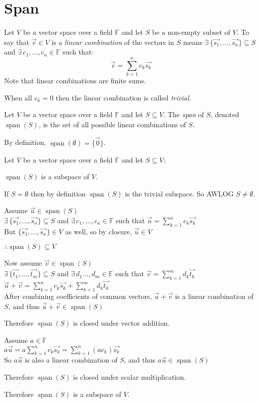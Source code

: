 \documentclass[letterpaper,12pt,fleqn]{article}
\newcommand{\F}{\mathbb{F}}
\newcommand{\vu}{\vec{u}}
\newcommand{\vv}{\vec{v}}
\newcommand{\vz}{\vec{0}}
\DeclareMathOperator{\spn}{span}
\begin{document}
\section*{Span}

\begin{definition}
  Let $V$ be a vector space over a field $\F$ and let $S$ be a non-empty subset
  of $V$. To say that $\vv\in V$ is a \emph{linear combination} of the
  vectors in $S$ means $\exists\,\{\vec{s_1},\ldots,\vec{s_n}\}\subseteq S$ and
  $\exists\,c_1,\ldots,c_n\in\F$ such that:
  \[\vv=\sum_{k=1}^nc_k\vec{s_k}\]
  Note that linear combinations are finite sums.

  When all $c_k=0$ then the linear combination is called \emph{trivial}.
\end{definition}

\begin{definition}[Span]
  Let $V$ be a vector space over a field $\F$ and let $S\subseteq V$. The
  \emph{span} of $S$, denoted $\spn(S)$, is the set of all possible linear
  combinations of $S$.

  By definition, $\spn(\emptyset)=\{\vz\}$.
\end{definition}

\begin{theorem}
  Let $V$ be a vector space over a field $\F$ and let $S\subseteq V$:

  $\spn(S)$ is a subspace of $V$.
\end{theorem}

\begin{theproof}
  If $S=\emptyset$ then by definition $\spn(S)$ is the trivial subspace. So
  AWLOG $S\ne\emptyset$.

  Assume $\vu\in\spn(S)$ \\
  $\exists\,\{\vec{s_1},\ldots,\vec{s_n}\}\subseteq S$ and
  $\exists\,c_1,\ldots,c_n\in\F$ such that $\vu=\sum_{k=1}^nc_k\vec{s_k}$ \\
  But $\{\vec{s_1},\ldots,\vec{s_n}\}\in V$ as well, so by closure, $\vu\in V$

  $\therefore \spn(S)\subseteq V$

  Now assume $\vv\in\spn(S)$ \\
  $\exists\,\{\vec{t_1},\ldots,\vec{t_m}\}\subseteq S$ and
  $\exists\,d_1\ldots,d_m\in\F$ such that $\vv=\sum_{k=1}^md_k\vec{t_k}$ \\
  $\vu+\vv=\sum_{k=1}^nc_k\vec{s_k}+\sum_{k=1}^md_k\vec{t_k}$ \\
  After combining coefficients of common vectors, $\vu+\vv$ is a linear
  combination of $S$, and thus $\vu+\vv\in\spn(S)$

  Therefore $\spn(S)$ is closed under vector addition.

  Assume $a\in\F$ \\
  $a\vu=a\sum_{k=1}^nc_k\vec{s_k}=\sum_{k=1}^n(ac_k)\vec{s_k}$ \\
  So $a\vu$ is also a linear combination of $S$, and thus $a\vu\in\spn(S)$

  Therefore $\spn(S)$ is closed under scalar multiplication.

  Therefore $\spn(S)$ is a subspace of $V$.
\end{theproof}
\end{document}
